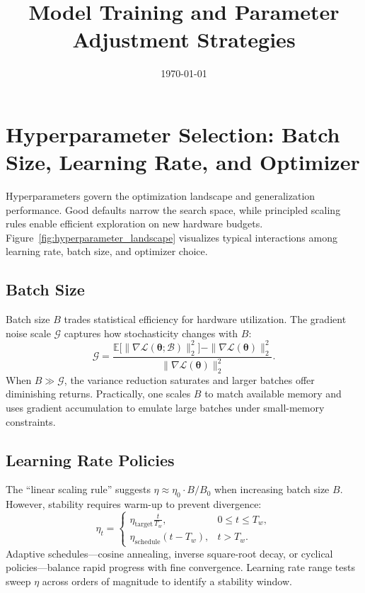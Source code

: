 \documentclass{article}
\title{Model Training and Parameter Adjustment Strategies}
\author{}
\date{\today}
\begin{document}
\maketitle
\tableofcontents
\FloatBarrier

\section{Hyperparameter Selection: Batch Size, Learning Rate, and Optimizer}
Hyperparameters govern the optimization landscape and generalization performance. Good defaults narrow the search space, while principled scaling rules enable efficient exploration on new hardware budgets. Figure~\ref{fig:hyperparameter_landscape} visualizes typical interactions among learning rate, batch size, and optimizer choice.

\subsection{Batch Size}
Batch size $B$ trades statistical efficiency for hardware utilization. The gradient noise scale $\mathcal{G}$ captures how stochasticity changes with $B$:
\begin{equation}
  \mathcal{G} = \frac{\mathbb{E}\bigl[\|\nabla \mathcal{L}(\boldsymbol{\theta}; \mathcal{B})\|_2^2\bigr] - \|\nabla \mathcal{L}(\boldsymbol{\theta})\|_2^2}{\|\nabla \mathcal{L}(\boldsymbol{\theta})\|_2^2}.
\end{equation}
When $B \gg \mathcal{G}$, the variance reduction saturates and larger batches offer diminishing returns. Practically, one scales $B$ to match available memory and uses gradient accumulation to emulate large batches under small-memory constraints.

\subsection{Learning Rate Policies}
The ``linear scaling rule'' suggests $\eta \approx \eta_0 \cdot B / B_0$ when increasing batch size $B$. However, stability requires warm-up to prevent divergence:
\begin{equation}
  \eta_t =
  \begin{cases}
    \eta_{\text{target}} \frac{t}{T_w}, & 0 \le t \le T_w, \\
    \eta_{\text{schedule}}(t - T_w), & t > T_w.
  \end{cases}
\end{equation}
Adaptive schedules---cosine annealing, inverse square-root decay, or cyclical policies---balance rapid progress with fine convergence. Learning rate range tests sweep $\eta$ across orders of magnitude to identify a stability window.
\end{document}
